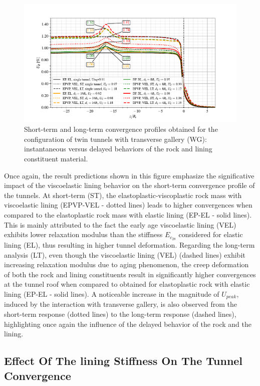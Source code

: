 \documentclass[Journal,letterpaper, NoLists,SectionNumbers]{ascelike-new}
\begin{document}
\begin{figure}[h!]
	\centering
	\includegraphics[scale=0.9]{Convergence Profiles - EP_EL_EPVP_VEL_WG_ST_LT_anotate.pdf}
	\caption{Short-term and long-term convergence profiles obtained for the configuration of twin tunnels with transverse gallery (WG): instantaneous versus delayed behaviors of the rock and lining constituent material.}
	\label{EP-EL-EPVP-VEL-WG-ST-LT}
\end{figure}

Once again, the result predictions shown in this figure emphasize the significative impact of the viscoelastic lining behavior on the short-term convergence profile of the tunnels. At short-term (ST), the elastoplastic-viscoplastic rock mass with viscoelastic lining (EPVP-VEL - dotted lines) leads to higher convergences when compared to the elastoplastic rock mass with elastic lining (EP-EL - solid lines). This is mainly attributed to the fact the early age viscoelastic lining (VEL) exhibits lower relaxation modulus than the stiffness $E_{c_{28}}$ considered for elastic lining (EL), thus resulting in higher tunnel deformation. Regarding the long-term analysis (LT), even though the viscoelastic lining (VEL) (dashed lines) exhibit increasing relaxation modulus due to aging phenomenon, the creep deformation of both the rock and lining constituents result in significantly higher convergences at the tunnel roof when compared to obtained for elastoplastic rock with elastic lining (EP-EL - solid lines). A noticeable increase in the magnitude of $U_{peak}$, induced by the interaction with transverse gallery, is also observed from the short-term response (dotted lines) to the long-term response (dashed lines), highlighting once again the influence of the delayed behavior of the rock and the lining.

\subsection{Effect Of The lining Stiffness On The Tunnel Convergence}\label{}
\end{document}
